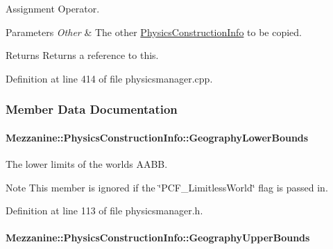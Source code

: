 Assignment Operator. 


\begin{DoxyParams}{Parameters}
{\em Other} & The other \hyperlink{classMezzanine_1_1PhysicsConstructionInfo}{PhysicsConstructionInfo} to be copied. \\
\hline
\end{DoxyParams}
\begin{DoxyReturn}{Returns}
Returns a reference to this. 
\end{DoxyReturn}


Definition at line 414 of file physicsmanager.cpp.



\subsubsection{Member Data Documentation}
\hypertarget{classMezzanine_1_1PhysicsConstructionInfo_aed6f8f0555fe4dec58758f6d774cbcee}{
\paragraph[{GeographyLowerBounds}]{ {\bf Mezzanine::PhysicsConstructionInfo::GeographyLowerBounds}}\hfill}
\label{classMezzanine_1_1PhysicsConstructionInfo_aed6f8f0555fe4dec58758f6d774cbcee}


The lower limits of the worlds AABB. 

\begin{DoxyNote}{Note}
This member is ignored if the \char`\"{}PCF\_\-LimitlessWorld\char`\"{} flag is passed in. 
\end{DoxyNote}


Definition at line 113 of file physicsmanager.h.

\hypertarget{classMezzanine_1_1PhysicsConstructionInfo_aa1794e928aea2ce5f2e9ad4f467b1c14}{
\paragraph[{GeographyUpperBounds}]{ {\bf Mezzanine::PhysicsConstructionInfo::GeographyUpperBounds}}\hfill}
\label{classMezzanine_1_1PhysicsConstructionInfo_aa1794e928aea2ce5f2e9ad4f467b1c14}


